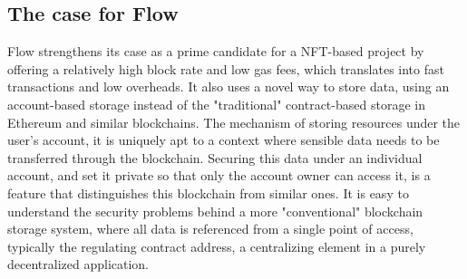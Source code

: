 \documentclass[../main.tex]{subfiles}
\begin{document}
\subsection{The case for Flow}
Flow strengthens its case as a prime candidate for a NFT-based project by offering a relatively high block rate and low gas fees, which translates into fast transactions and low overheads. It also uses a novel way to store data, using an account-based storage instead of the "traditional" contract-based storage in Ethereum and similar blockchains. The mechanism of storing resources under the user's account, it is uniquely apt to a context where sensible data needs to be transferred through the blockchain. Securing this data under an individual account, and set it private so that only the account owner can access it, is a feature that distinguishes this blockchain from similar ones. It is easy to understand the security problems behind a more "conventional" blockchain storage system, where all data is referenced from a single point of access, typically the regulating contract address, a centralizing element in a purely decentralized application.
\end{document}
